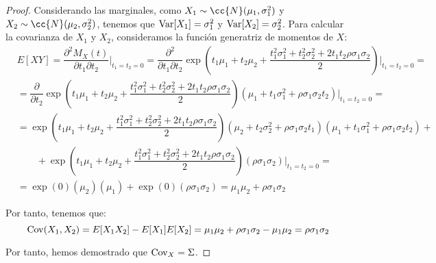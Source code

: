 \begin{proof}
    Considerando las marginales, como $X_1\sim \cc{N}(\mu_1, \sigma_1^2)$ y $X_2\sim \cc{N}(\mu_2, \sigma_2^2)$, tenemos que $\operatorname{Var}[X_1]=\sigma_1^2$ y $\operatorname{Var}[X_2]=\sigma_2^2$. Para calcular la covarianza de $X_1$ y $X_2$, consideramos la función generatriz de momentos de $X$:
    \begin{align*}
        &E[XY] = \dfrac{\partial^2 M_X(t)}{\partial t_1\partial t_2}\Bigg|_{t_1=t_2=0}
        = \dfrac{\partial^2}{\partial t_1\partial t_2}\exp\left(t_1\mu_1+t_2\mu_2+\dfrac{t_1^2\sigma_1^2+t_2^2\sigma_2^2+2t_1t_2\rho\sigma_1\sigma_2}{2}\right)\Bigg|_{t_1=t_2=0}
        =\\&= \dfrac{\partial}{\partial t_2}\exp\left(t_1\mu_1+t_2\mu_2+\dfrac{t_1^2\sigma_1^2+t_2^2\sigma_2^2+2t_1t_2\rho\sigma_1\sigma_2}{2}\right)\left(\mu_1+t_1\sigma_1^2+\rho\sigma_1\sigma_2t_2\right)\Bigg|_{t_1=t_2=0}
        =\\&= \exp\left(t_1\mu_1+t_2\mu_2+\dfrac{t_1^2\sigma_1^2+t_2^2\sigma_2^2+2t_1t_2\rho\sigma_1\sigma_2}{2}\right)\left(\mu_2+t_2\sigma_2^2+\rho\sigma_1\sigma_2t_1\right)\left(\mu_1+t_1\sigma_1^2+\rho\sigma_1\sigma_2t_2\right)+\\&\qquad +\exp\left(t_1\mu_1+t_2\mu_2+\dfrac{t_1^2\sigma_1^2+t_2^2\sigma_2^2+2t_1t_2\rho\sigma_1\sigma_2}{2}\right)(\rho\sigma_1\sigma_2)\Bigg|_{t_1=t_2=0}
        =\\&= \exp\left(0\right)(\mu_2)(\mu_1)+\exp\left(0\right)(\rho\sigma_1\sigma_2)
        = \mu_1\mu_2+\rho\sigma_1\sigma_2
    \end{align*}

    Por tanto, tenemos que:
    \begin{equation*}
        \operatorname{Cov} (X_1, X_2) = E[X_1X_2]-E[X_1]E[X_2] = \mu_1\mu_2+\rho\sigma_1\sigma_2-\mu_1\mu_2 = \rho\sigma_1\sigma_2
    \end{equation*}

    Por tanto, hemos demostrado que $\operatorname{Cov}_X=\Sigma$.
\end{proof}


